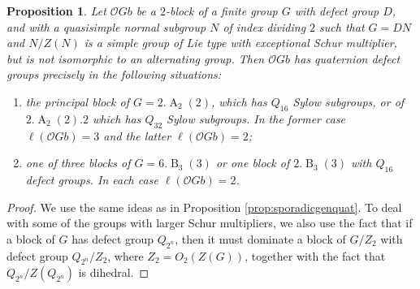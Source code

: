 \documentclass{amsart}
\theoremstyle{plain}\newtheorem{Theorem}{Theorem}[section]
\theoremstyle{plain}\newtheorem{Conjecture}[Theorem]{Conjecture}
\theoremstyle{plain}\newtheorem{Corollary}[Theorem]{Corollary}
\theoremstyle{plain}\newtheorem{Lemma}[Theorem]{Lemma}
\theoremstyle{plain}\newtheorem{Proposition}[Theorem]{Proposition}
\theoremstyle{definition}\newtheorem{Definition}[Theorem]{Definition}
\theoremstyle{definition}\newtheorem{Example}[Theorem]{Example}
\theoremstyle{definition}\newtheorem{Examples}[Theorem]{Examples}
\theoremstyle{definition}\newtheorem{Exercise}[Theorem]{Exercise}
\theoremstyle{definition}\newtheorem{Notation}[Theorem]{Notation}
\theoremstyle{definition}\newtheorem{Remark}[Theorem]{Remark}
\theoremstyle{definition}\newtheorem{Remarks}[Theorem]{Remarks}
\def\CO{{\mathcal{O}}}    \def\OPE{{\mathcal{O}(P\rtimes E)}}
\newcommand{\type}{\operatorname}
\newcommand{\zent} {Z}
\numberwithin{equation}{section}
\begin{document}
\begin{Proposition}\label{prop:excschur}
Let $\CO Gb$ be a $2$-block of a finite group $G$ with defect group $D$, and with a quasisimple normal subgroup $N$ of index dividing $2$ such that $G=DN$ and $N/\zent(N)$ is a simple group of Lie type with exceptional Schur multiplier, but is not isomorphic to an alternating group. Then $\CO Gb$ has quaternion defect groups precisely in the following situations:

\begin{enumerate}
\item the principal block of $G=2.\type{A}_2(2)$, which has $Q_{16}$ Sylow subgroups, or of $2.\type{A}_2(2).2$ which has $Q_{32}$ Sylow subgroups. In the former case $\ell(\CO Gb)=3$ and the latter $\ell(\CO Gb)=2$;
    \item one of three blocks of $G=6.\type{B}_3(3)$ or one block of $2.\type{B}_3(3)$ with $Q_{16}$ defect groups. In each case $\ell(\CO Gb)=2$.
\end{enumerate}




\end{Proposition}
\begin{proof}
 We use the same ideas as in Proposition \ref{prop:sporadicgenquat}. To deal with some of the groups with larger Schur multipliers, we also use the fact that if a block of $G$ has defect group $Q_{2^n}$, then it must dominate a block of $G/Z_2$ with defect group $Q_{2^n}/Z_2$, where $Z_2=O_2(\zent(G))$, together with the fact that $Q_{2^n}/\zent(Q_{2^n})$ is dihedral.
\end{proof}
\end{document}
